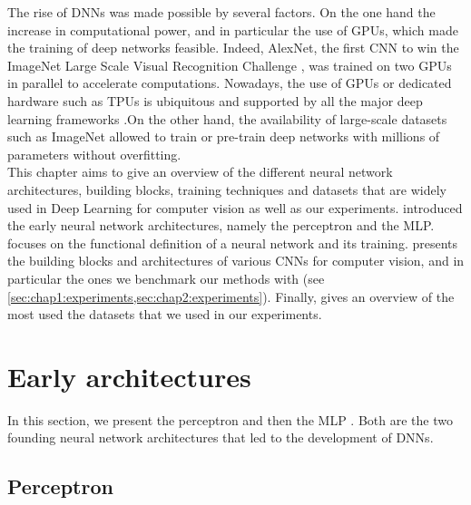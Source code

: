 The rise of \acp{DNN} was made possible by several factors. On the one hand the
increase in computational power, and in particular the use of \acp{GPU}, which
made the training of deep networks feasible. Indeed, AlexNet, the first \ac{CNN}
to win the ImageNet Large Scale Visual Recognition Challenge
\cite{DBLP:conf/nips/KrizhevskySH12}, was trained on two \acp{GPU} in parallel
to accelerate computations. Nowadays, the use of \acp{GPU} or dedicated hardware
such as \acp{TPU} is ubiquitous and supported by all the major deep learning
frameworks
\cite{DBLP:journals/corr/AbadiABBCCCDDDG16,DBLP:conf/nips/PaszkeGMLBCKLGA19}.On
the other hand, the availability of large-scale datasets such as ImageNet
\cite{deng2009imagenet} allowed to train or pre-train deep networks with
millions of parameters without overfitting.\\

This chapter aims to give an overview of the different neural network
architectures, building blocks, training techniques and datasets that are widely
used in Deep Learning for computer vision as well as our experiments.
 introduced the early neural network
architectures, namely the perceptron and the \ac{MLP}. 
focuses on the functional definition of a neural network and its training.
 presents the building blocks and architectures of various
\acp{CNN} for computer vision, and in particular the ones we benchmark our
methods with (see \cref{sec:chap1:experiments,sec:chap2:experiments}). Finally,
 gives an overview of the most used the datasets that we
used in our experiments.


\section{Early architectures}\label{sec:dlo:early_architectures}

In this section, we present the perceptron \cite{rosenblatt1958perceptron} and
then the \acl{MLP} \cite{rosenblatt1961principles,rumelhart1986learning}. Both
are the two founding neural network architectures that led to the development of
\aclp{DNN}.

\subsection{Perceptron}\label{sec:dlo:perceptron}


